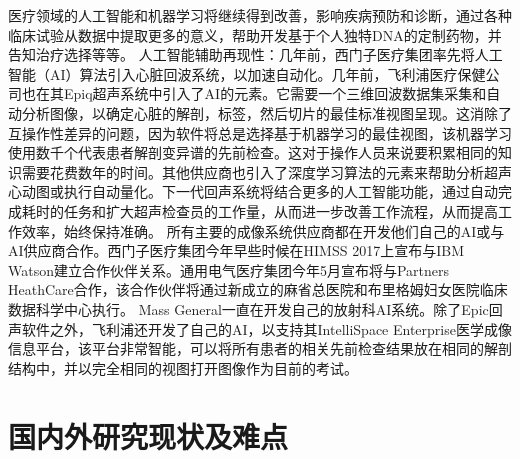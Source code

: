医疗领域的人工智能和机器学习将继续得到改善，影响疾病预防和诊断，通过各种临床试验从数据中提取更多的意义，帮助开发基于个人独特DNA的定制药物，并告知治疗选择等等。
人工智能辅助再现性：几年前，西门子医疗集团率先将人工智能（AI）算法引入心脏回波系统，以加速自动化。几年前，飞利浦医疗保健公司也在其Epiq超声系统中引入了AI的元素。它需要一个三维回波数据集采集和自动分析图像，以确定心脏的解剖，标签，然后切片的最佳标准视图呈现。这消除了互操作性差异的问题，因为软件将总是选择基于机器学习的最佳视图，该机器学习使用数千个代表患者解剖变异谱的先前检查。这对于操作人员来说要积累相同的知识需要花费数年的时间。其他供应商也引入了深度学习算法的元素来帮助分析超声心动图或执行自动量化。下一代回声系统将结合更多的人工智能功能，通过自动完成耗时的任务和扩大超声检查员的工作量，从而进一步改善工作流程，从而提高工作效率，始终保持准确。
所有主要的成像系统供应商都在开发他们自己的AI或与AI供应商合作。西门子医疗集团今年早些时候在HIMSS 2017上宣布与IBM Watson建立合作伙伴关系。通用电气医疗集团今年5月宣布将与Partners HeathCare合作，该合作伙伴将通过新成立的麻省总医院和布里格姆妇女医院临床数据科学中心执行。 Mass General一直在开发自己的放射科AI系统。除了Epic回声软件之外，飞利浦还开发了自己的AI，以支持其IntelliSpace Enterprise医学成像信息平台，该平台非常智能，可以将所有患者的相关先前检查结果放在相同的解剖结构中，并以完全相同的视图打开图像作为目前的考试。            
\section{国内外研究现状及难点}
